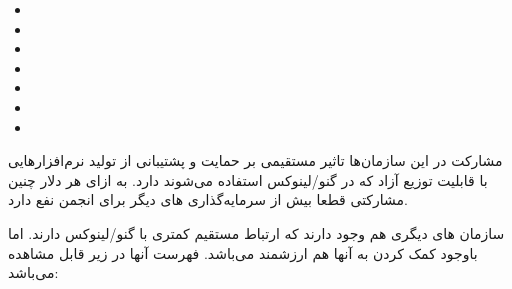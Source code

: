 \begin{itemize}
\item
{}

\item
{}

\item
{}

\item
{}

\item
{}

\item
{}

\item 
{}
\end{itemize}

مشارکت در این سازمان‌ها تاثیر مستقیمی بر حمایت و پشتیبانی از تولید
نرم‌افزارهایی با قابلیت توزیع آزاد که در گنو/لینوکس استفاده می‌شوند دارد.
به ازای هر دلار چنین مشارکتی قطعا بیش از سرمایه‌گذاری های دیگر برای انجمن نفع دارد.

سازمان های دیگری هم وجود دارند که ارتباط مستقیم کمتری با گنو/لینوکس دارند.
اما باوجود کمک کردن به آنها هم ارزشمند می‌باشد. فهرست آنها در زیر قابل مشاهده می‌باشد:

